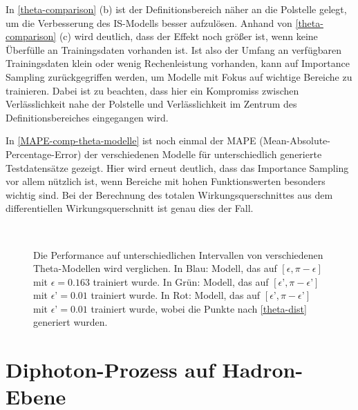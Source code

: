 In \textsf{\autoref{theta-comparison} (b)}  ist der Definitionsbereich näher an die Polstelle gelegt, um die Verbesserung des IS-Modells besser aufzulösen. Anhand von \textsf{\autoref{theta-comparison} (c)}  wird deutlich, dass der Effekt noch größer ist, wenn keine Überfülle an Trainingsdaten vorhanden ist. Ist also der Umfang an verfügbaren Trainingsdaten klein oder wenig Rechenleistung vorhanden, kann auf Importance Sampling zurückgegriffen werden, um Modelle mit Fokus auf wichtige Bereiche zu trainieren. Dabei ist zu beachten, dass hier ein Kompromiss zwischen Verlässlichkeit nahe der Polstelle und Verlässlichkeit im Zentrum des Definitionsbereiches eingegangen wird.

In \textsf{\autoref{MAPE-comp-theta-modelle}} ist noch einmal der MAPE (Mean-Absolute-Percentage-Error) der verschiedenen Modelle für unterschiedlich generierte Testdatensätze gezeigt. Hier wird erneut deutlich, dass das Importance Sampling vor allem nützlich ist, wenn Bereiche mit hohen Funktionswerten besonders wichtig sind. Bei der Berechnung des totalen Wirkungsquerschnittes aus dem differentiellen Wirkungsquerschnitt ist genau dies der Fall.
\begin{figure}[h]
	\centering
	 \\
	\captionsetup{justification=justified}	
	\caption{Die Performance auf unterschiedlichen Intervallen von verschiedenen Theta-Modellen wird verglichen. In Blau: Modell, das auf ${[\epsilon, \pi - \epsilon]}$ mit $\epsilon = 0.163$ trainiert wurde. In Grün: Modell, das auf ${[\epsilon’, \pi - \epsilon’]}$ mit $\epsilon’=0.01$ trainiert wurde. In Rot: Modell, das auf ${[\epsilon’, \pi - \epsilon’]}$ mit $\epsilon’=0.01$ trainiert wurde, wobei die Punkte nach \textsf{\autoref{theta-dist}} generiert wurden.}
	\label{theta-comparison}
\end{figure}
\section{Diphoton-Prozess auf Hadron-Ebene}
